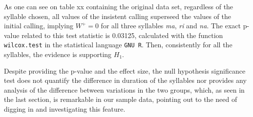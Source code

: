 \documentclass[11pt]{article}
\begin{document}


As one can see on table xx containing the original data set, regardless of the syllable chosen, all values of the insistent calling superseed the values of the initial calling, implying $W^+ = 0$ for all three syllables {\it{ma}}, {\it{ri}} and {\it{na}}. The exact p-value related to this test statistic is 0.03125, calculated with the function \texttt{wilcox.test} in the statistical language \texttt{GNU R}. Then, consistently for all the syllables, the evidence is supporting $H_1.$



Despite providing the p-value and the effect size, the null hypothesis significance test does not quantify the difference in duration of the syllables nor provides any analysis of the difference between variations in the two groups, which, as seen in the last section, is remarkable in our sample data, pointing out to the need of digging in and investigating this feature. 

\end{document}
